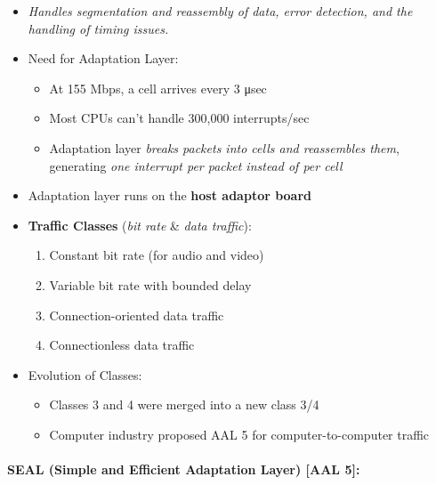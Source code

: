 \documentclass[
]{article}
\providecommand{\tightlist}{%
  \setlength{\itemsep}{0pt}\setlength{\parskip}{0pt}}
\begin{document}
\begin{itemize}
\tightlist
\item
  \emph{Handles segmentation and reassembly of data, error detection,
  and the handling of timing issues.}
\item
  Need for Adaptation Layer:

  \begin{itemize}
  \tightlist
  \item
    At 155 Mbps, a cell arrives every 3 μsec
  \item
    Most CPUs can't handle 300,000 interrupts/sec
  \item
    Adaptation layer \emph{breaks packets into cells and reassembles
    them}, generating \emph{one interrupt per packet instead of per
    cell}
  \end{itemize}
\item
  Adaptation layer runs on the \textbf{host adaptor board}
\item
  \textbf{Traffic Classes} (\emph{bit rate} \& \emph{data traffic}):

  \begin{enumerate}
  \tightlist
  \item
    Constant bit rate (for audio and video)
  \item
    Variable bit rate with bounded delay
  \item
    Connection-oriented data traffic
  \item
    Connectionless data traffic
  \end{enumerate}
\item
  Evolution of Classes:

  \begin{itemize}
  \tightlist
  \item
    Classes 3 and 4 were merged into a new class 3/4
  \item
    Computer industry proposed AAL 5 for computer-to-computer traffic
  \end{itemize}
\end{itemize}

\hypertarget{seal-simple-and-efficient-adaptation-layer-aal-5}{%
\paragraph{SEAL (Simple and Efficient Adaptation Layer) {[}AAL
5{]}:}\label{seal-simple-and-efficient-adaptation-layer-aal-5}}
\end{document}
